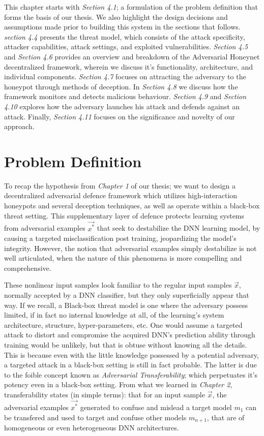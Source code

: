 \documentclass[grad,lot,lof,11pt,oneside,onehalfspace]{RUthesis}
\begin{document}
This chapter starts with \textit{Section 4.1}; a formulation of the problem definition that forms  the basis of our thesis.  We also highlight the design decisions and assumptions made prior to building this system in the sections that follows. \textit{section 4.4} presents the threat model,
which consists of the attack specificity, attacker capabilities, attack settings, and exploited vulnerabilities. \textit{Section 4.5} and \textit{Section 4.6 }provides an overview and breakdown of the Adversarial Honeynet decentralized framework, wherein we discuss it’s functionality, architecture, and individual
components. \textit{Section  4.7} focuses on attracting the adversary to the honeypot through methods of deception.  In \textit{Section 4.8} we discuss how the framework monitors and detects malicious behaviour. \textit{Section 4.9} and \textit{Section 4.10} explores how the adversary launches his attack and defends against an attack.  Finally, \textit{Section 4.11} focuses on the significance and novelty of our approach.

\section{Problem Definition}
To recap the hypothesis from \textit{Chapter 1} of our thesis; we want to design a decentralized adversarial defence framework which utilizes high-interaction honeypots and several deception techniques, as well as operate within a black-box threat setting. This supplementary layer of defence protects learning systems from adversarial examples \textit{$\vec{x^{*}}$} that seek to destabilize the DNN learning model, by causing a targeted misclassification
post training, jeopardizing the model’s integrity.  However, the notion that adversarial examples simply destabilize is not well articulated, when the nature of this phenomena is more compelling and comprehensive.

These nonlinear input samples look familiar to the regular input samples \textit{$\vec{x}$}, normally accepted by a DNN classifier,  but they only superficially appear that way.  If we recall,  a Black-box threat  model  is  one  where  the  adversary  possess limited,  if  in  fact  no  internal  knowledge at all, of the learning’s system architecture, structure, hyper-parameters, etc.  One would  assume  a  targeted  attack  to  distort  and  compromise  the  acquired  DNN’s  prediction ability through training would be unlikely, but that is obtuse without knowing all the details.  This is because even with the little knowledge possessed by a potential adversary, a targeted attack in a black-box setting is still in fact probable.  The latter
is due to the foible concept known as
\textit{Adversarial Transferability}; which perpetuates it’s
potency even in a black-box setting.  From what we learned in \textit{Chapter 2}, transferability
states (in simple terms):  that for an input sample $\vec{x}$,  the adversarial examples \textit{$\vec{x^{*}}$} generated to confuse and mislead a target model \textit{$m_{1}$} can be transfered
and used to target and confuse other models \textit{$m_{n+1}$}, that are of homogeneous or even heterogeneous DNN architectures.
 
\end{document}
